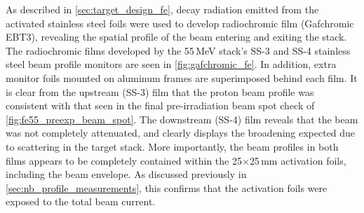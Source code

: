 As described in \autoref{sec:target_design_fe}, decay radiation emitted from the activated stainless steel foils were used to develop radiochromic film (Gafchromic EBT3), revealing the spatial profile of the beam entering and exiting the stack.
% 
% 
% 
% 
% 
% 
% 
The radiochromic films developed by the 55\,MeV stack's SS-3 and SS-4 stainless steel beam profile monitors are seen in \autoref{fig:gafchromic_fe}.
In addition, extra  monitor foils mounted on  aluminum frames are superimposed behind each film.
It is clear from the upstream (SS-3) film that the proton beam profile was consistent with that seen in the final pre-irradiation beam spot check of  \autoref{fig:fe55_preexp_beam_spot}.
The downstream (SS-4) film  reveals that the beam was not completely attenuated,  
and clearly displays the  broadening expected due to scattering in the target stack. 
More importantly, the beam profiles in both films appears to be completely contained within the 25$\times$25\,mm activation foils, including the beam envelope.
As discussed previously in \autoref{sec:nb_profile_measurements}, this confirms that the activation foils were exposed to  the total beam current.


